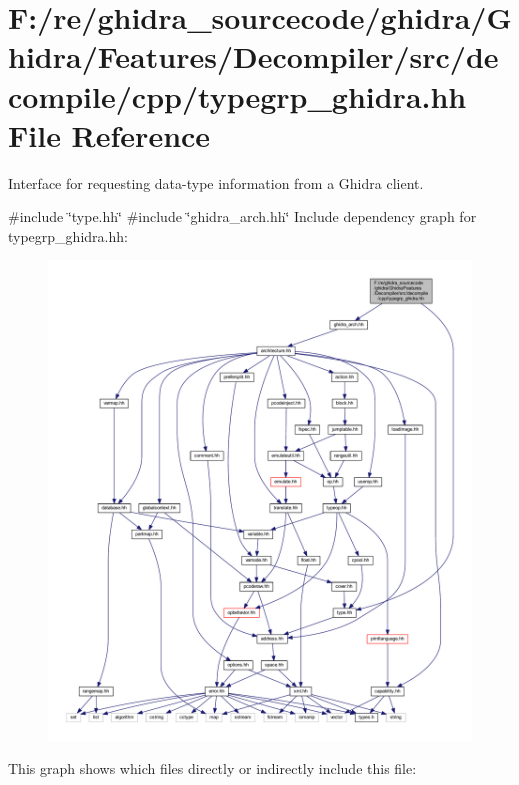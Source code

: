 \hypertarget{typegrp__ghidra_8hh}{}\section{F\+:/re/ghidra\+\_\+sourcecode/ghidra/\+Ghidra/\+Features/\+Decompiler/src/decompile/cpp/typegrp\+\_\+ghidra.hh File Reference}
\label{typegrp__ghidra_8hh}


Interface for requesting data-\/type information from a Ghidra client.  


{\ttfamily \#include \char`\"{}type.\+hh\char`\"{}}\newline
{\ttfamily \#include \char`\"{}ghidra\+\_\+arch.\+hh\char`\"{}}\newline
Include dependency graph for typegrp\+\_\+ghidra.\+hh\+:
\nopagebreak
\begin{figure}[H]
\begin{center}
\leavevmode
\includegraphics[width=350pt]{typegrp__ghidra_8hh__incl}
\end{center}
\end{figure}
This graph shows which files directly or indirectly include this file\+:
